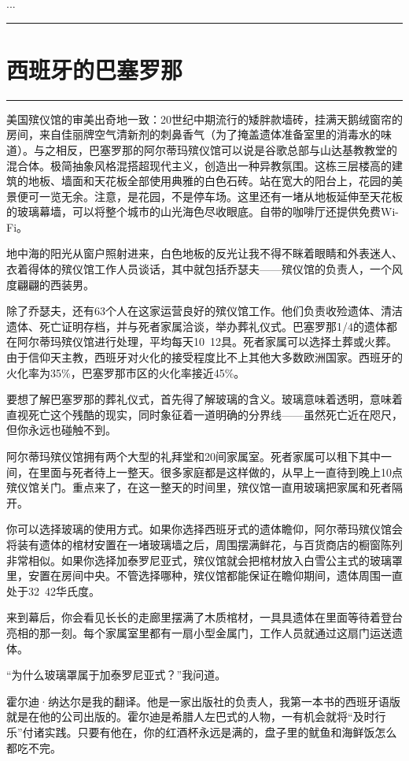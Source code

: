 \documentclass[12pt,oneside]{book}
\newcommand\hr{\par\noindent\hrule}
\begin{document}
...

\hr

\section{西班牙的巴塞罗那}
\hr 

美国殡仪馆的审美出奇地一致：20世纪中期流行的矮胖款墙砖，挂满天鹅绒窗帘的房间，来自佳丽牌空气清新剂的刺鼻香气（为了掩盖遗体准备室里的消毒水的味道）。与之相反，巴塞罗那的阿尔蒂玛殡仪馆可以说是谷歌总部与山达基教教堂的混合体。极简抽象风格混搭超现代主义，创造出一种异教氛围。这栋三层楼高的建筑的地板、墙面和天花板全部使用典雅的白色石砖。站在宽大的阳台上，花园的美景便可一览无余。注意，是花园，不是停车场。这里还有一堵从地板延伸至天花板的玻璃幕墙，可以将整个城市的山光海色尽收眼底。自带的咖啡厅还提供免费Wi-Fi。

地中海的阳光从窗户照射进来，白色地板的反光让我不得不眯着眼睛和外表迷人、衣着得体的殡仪馆工作人员谈话，其中就包括乔瑟夫——殡仪馆的负责人，一个风度翩翩的西装男。

除了乔瑟夫，还有63个人在这家运营良好的殡仪馆工作。他们负责收殓遗体、清洁遗体、死亡证明存档，并与死者家属洽谈，举办葬礼仪式。巴塞罗那1/4的遗体都在阿尔蒂玛殡仪馆进行处理，平均每天10~12具。死者家属可以选择土葬或火葬。由于信仰天主教，西班牙对火化的接受程度比不上其他大多数欧洲国家。西班牙的火化率为35\%，巴塞罗那市区的火化率接近45\%。

要想了解巴塞罗那的葬礼仪式，首先得了解玻璃的含义。玻璃意味着透明，意味着直视死亡这个残酷的现实，同时象征着一道明确的分界线——虽然死亡近在咫尺，但你永远也碰触不到。

阿尔蒂玛殡仪馆拥有两个大型的礼拜堂和20间家属室。死者家属可以租下其中一间，在里面与死者待上一整天。很多家庭都是这样做的，从早上一直待到晚上10点殡仪馆关门。重点来了，在这一整天的时间里，殡仪馆一直用玻璃把家属和死者隔开。

你可以选择玻璃的使用方式。如果你选择西班牙式的遗体瞻仰，阿尔蒂玛殡仪馆会将装有遗体的棺材安置在一堵玻璃墙之后，周围摆满鲜花，与百货商店的橱窗陈列非常相似。如果你选择加泰罗尼亚式，殡仪馆就会把棺材放入白雪公主式的玻璃罩里，安置在房间中央。不管选择哪种，殡仪馆都能保证在瞻仰期间，遗体周围一直处于32~42华氏度。

来到幕后，你会看见长长的走廊里摆满了木质棺材，一具具遗体在里面等待着登台亮相的那一刻。每个家属室里都有一扇小型金属门，工作人员就通过这扇门运送遗体。

“为什么玻璃罩属于加泰罗尼亚式？”我问道。

霍尔迪·纳达尔是我的翻译。他是一家出版社的负责人，我第一本书的西班牙语版就是在他的公司出版的。霍尔迪是希腊人左巴式的人物，一有机会就将“及时行乐”付诸实践。只要有他在，你的红酒杯永远是满的，盘子里的鱿鱼和海鲜饭怎么都吃不完。
\end{document}

